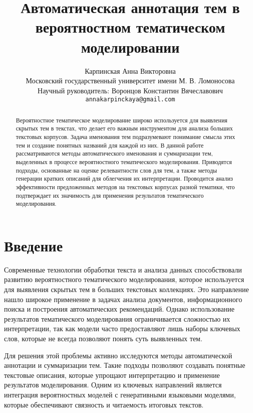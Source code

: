 \documentclass{article}
\title{Автоматическая аннотация тем в вероятностном тематическом моделировании}
\author{ Карпинская Анна Викторовна\\
	Московский государственный университет имени М. В. Ломоносова \\
        Научный руководитель: Воронцов Константин Вячеславович \\
 \texttt{annakarpinckaya@gmail.com} \\
}
\date{}
\begin{document}
\maketitle

\begin{abstract}
	Вероятностное тематическое моделирование широко используется для выявления скрытых тем в текстах, что делает его важным инструментом для анализа больших текстовых корпусов. Задача именования тем подразумевают понимание смысла этих тем и создание понятных названий для каждой из них. В данной работе рассматриваются методы автоматического именования и суммаризации тем, выделенных в процессе вероятностного тематического моделирования. Приводятся подходы, основанные на оценке релевантности слов для тем, а также методы генерации кратких описаний для облегчения их интерпретации. Проводится анализ эффективности предложенных методов на текстовых корпусах разной тематики, что подтверждает их значимость для применения результатов тематического моделирования.
\end{abstract}




\section{Введение}
Современные технологии обработки текста и анализа данных способствовали развитию вероятностного тематического моделирования, которое используется для выявления скрытых тем в больших текстовых коллекциях. \cite{blei2011introduction} Это направление нашло широкое применение в задачах анализа документов, информационного поиска и построения автоматических рекомендаций. Однако использование результатов тематического моделирования ограничивается сложностью их интерпретации, так как модели часто предоставляют лишь наборы ключевых слов, которые не всегда позволяют понять суть выявленных тем. \cite{perez2020interpretable}

Для решения этой проблемы активно исследуются методы автоматической аннотации и суммаризации тем. Такие подходы позволяют создавать понятные текстовые описания, которые упрощают интерпретацию и применение результатов моделирования. Одним из ключевых направлений является интеграция вероятностных моделей с генеративными языковыми моделями, которые обеспечивают связность и читаемость итоговых текстов.
\end{document}
